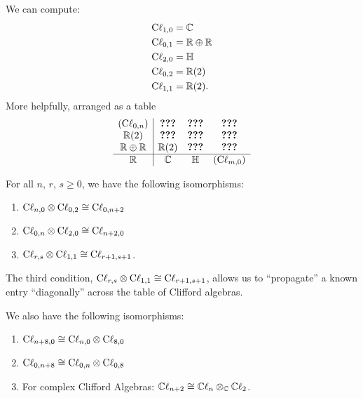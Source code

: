 We can compute:
\begin{subequations}
\begin{align}
\Cl_{1,0} &= \CC\\
\Cl_{0,1} &= \RR\oplus\RR\\
\Cl_{2,0} &= \HH\\
\Cl_{0,2} &= \RR(2)\\
\Cl_{1,1} &= \RR(2).
\end{align}
\end{subequations}
More helpfully, arranged as a table
\begin{equation}
\begin{array}{c|ccc}
(\Cl_{0,n})   & \huh   & \huh & \huh\\
  \RR(2)     & \huh   & \huh & \huh\\
\RR\oplus\RR & \RR(2) & \huh & \huh\\\hline
\RR          &  \CC   &  \HH & (\Cl_{m,0})
\end{array}
\end{equation}

\begin{theorem}
For all $n$, $r$, $s\geq0$, we have the following isomorphisms:
\begin{enumerate}
\item $\Cl_{n,0}\otimes\Cl_{0,2}\iso\Cl_{0,n+2}$
\item $\Cl_{0,n}\otimes\Cl_{2,0}\iso\Cl_{n+2,0}$
\item $\Cl_{r,s}\otimes\Cl_{1,1}\iso\Cl_{r+1,s+1}$.
\end{enumerate}
\end{theorem}

\begin{remark}
The third condition, $\Cl_{r,s}\otimes\Cl_{1,1}\iso\Cl_{r+1,s+1}$,
allows us to ``propagate'' a known entry ``diagonally'' across the table
of Clifford algebras.
\end{remark}

We also have the following isomorphisms:
\begin{enumerate}
\item $\Cl_{n+8,0}\iso\Cl_{n,0}\otimes\Cl_{8,0}$
\item $\Cl_{0,n+8}\iso\Cl_{0,n}\otimes\Cl_{0,8}$
\item For complex Clifford Algebras: $\CCl_{n+2}\iso\CCl_{n}\otimes_{\CC}\CCl_{2}$.
\end{enumerate}

